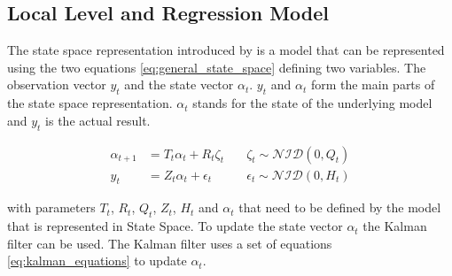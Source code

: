 \subsection{Local Level and Regression Model}
\label{subsec:state space}
The state space representation introduced by \cite{Kalman1960AProblems} is a model that can be represented using the two equations \eqref{eq:general_state_space} defining two variables. The observation vector $y_t$ and the state vector $\alpha_t$.  $y_t$ and $\alpha_t$ form the main parts of the state space representation. $\alpha_t$ stands for the state of the underlying model and $y_t$ is the actual result.

\begin{equation}
\label{eq:general_state_space}
\begin{aligned}
\alpha_{t+1} &= T_t\alpha_t + R_t\zeta_t \quad &\zeta_t \sim \mathcal{NID}(0, Q_t)\\
    y_t &= Z_t\alpha_t + \epsilon_t \quad &\epsilon_t \sim \mathcal{NID}(0, H_t)
\end{aligned}
\end{equation}

with parameters $T_t$, $R_t$, $Q_t$, $Z_t$, $H_t$ and $\alpha_t$ that need to be defined by the model that is represented in State Space. To update the state vector $\alpha_t$ the Kalman filter \citep{Kalman1960AProblems} can be used. The Kalman filter uses a set of equations \eqref{eq:kalman_equations} to update $\alpha_t$.

